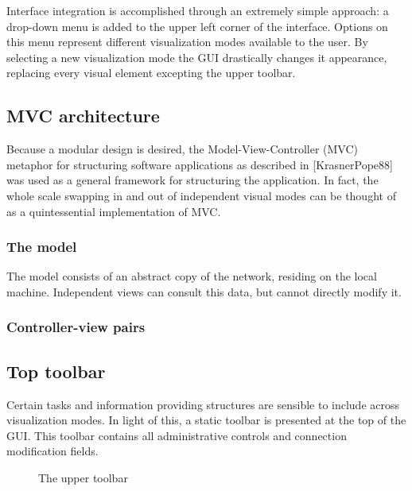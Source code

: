 Interface integration is accomplished through an extremely simple approach: a drop-down menu is added to the upper left corner of the interface. Options on this menu represent different visualization modes available to the user. By selecting a new visualization mode the GUI drastically changes it appearance, replacing every visual element excepting the upper toolbar.

	\subsection{MVC architecture} %
	\label{sec:mvc_architecture}

Because a modular design is desired, the Model-View-Controller (MVC) metaphor for structuring software applications as described in [KrasnerPope88] was used as a general framework for structuring the application. In fact, the whole scale swapping in and out of independent visual modes can be thought of as a quintessential implementation of MVC. 


		\subsubsection{The model}

The model consists of an abstract copy of the network, residing on the local machine. Independent views can consult this data, but cannot directly modify it.

		\subsubsection{Controller-view pairs}
	

	\subsection{Top toolbar} %
	\label{sec:top_toolbar}

Certain tasks and information providing structures are sensible to include across visualization modes. In light of this, a static toolbar is presented at the top of the GUI. This toolbar contains all administrative controls and connection modification fields. 

\begin{figure}[ht]
\centering
\caption{The upper toolbar}
\label{fig:toolbar}
\end{figure}

